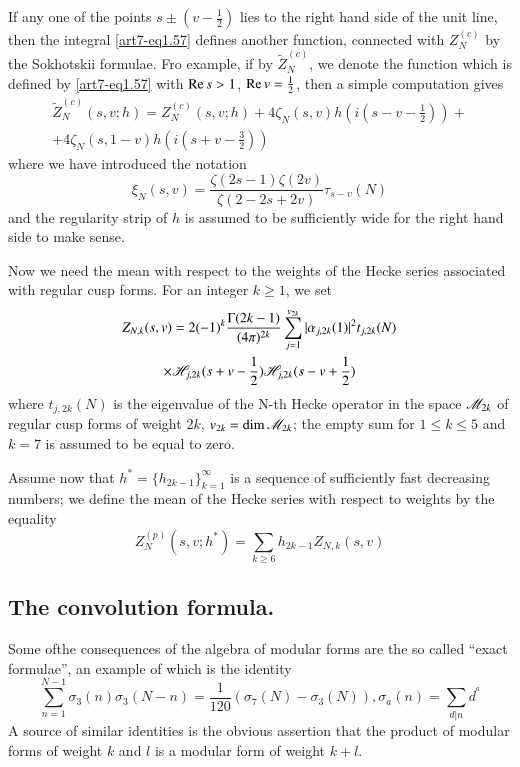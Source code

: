 If any one of the points $s \pm (v - \frac{1}{2})$ lies to the right hand side of the unit line, then the integral \eqref{art7-eq1.57} defines another function, connected with $Z^{(c)}_N$ by the Sokhotskii formulae. Fro example, if by $\tilde{Z}^{(c)}_N$, we denote the function which is defined by \eqref{art7-eq1.57} with $\operatorname{Re} s >1$, $\operatorname{Re} v = \frac{1}{2}$, then a simple computation gives
\begin{gather*}
\tilde{Z}_N^{(c)} (s,v;h) = Z^{(c)}_N (s, v; h) + 4 \zeta_N(s,v ) h (i(s-v-\frac{1}{2})) + \\
+ 4\zeta_N (s, 1-v) h(i(s+v-\frac{3}{2}))
\end{gather*}
where we have introduced the notation
$$
\xi_N (s,v) = \frac{\zeta (2s-1) \zeta(2v)}{\zeta(2-2s+2v)} \tau_{s-v} (N)
$$
and the regularity strip of $h$ is assumed to be sufficiently wide for the right hand side to make sense.

Now we need the mean with respect to the weights of the Hecke series associated with regular cusp forms. For an integer $k \geqslant 1$, we set
\begin{gather}
Z_{N,k} (s,v) = 2 (-1)^k\frac{\Gamma (2k-1)}{(4\pi)^{2k}} \sum\limits^{v_{2k}}_{j=1} |\alpha_{j,2k} (1)|^2 t_{j,2k} (N) \label{art7-eq1.58}\\
\times \mathscr{H}_{j, 2k} (s+v-\frac{1}{2}) \mathscr{H}_{j, 2k} (s-v+\frac{1}{2})\notag
\end{gather}
where $t_{j, 2k} (N)$ is the eigenvalue of the N-th Hecke operator in the space $\mathscr{M}_{2k}$ of regular cusp forms of weight $2k$, $v_{2k} = \dim \mathscr{M}_{2k}$; the empty sum for $1 \leqslant k \leqslant 5$ and $k=7$ is assumed to be equal to zero.

Assume now that $h^\ast =\{h_{2k-1}\}^\infty_{k=1}$ is a sequence of sufficiently fast decreasing numbers; we define the mean of the Hecke series with respect to weights by the equality
\begin{equation}
Z^{(p)}_N (s, v; h^\ast) = \sum\limits_{k \geqslant 6} h_{2k-1} Z_{N,k} (s,v)\label{art7-eq1.59}
\end{equation}

\subsection{The convolution formula.}\label{art7-subsec1.10}
Some of\pageoriginale the consequences of the algebra of modular forms are the so called ``exact formulae'', an example of which is the identity
\begin{equation}
\sum\limits^{N-1}_{n=1} \sigma_3 (n) \sigma_3 (N-n) = \frac{1}{120} (\sigma_7(N)-\sigma_3(N)), \sigma_a (n) = \sum\limits_{d|n} d^^a \label{art7-eq1.60}
\end{equation}
A source of similar identities is the obvious assertion that the product of modular forms of weight $k$ and $l$ is a modular form of weight $k+l$.

